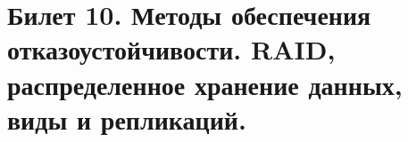 \newpage
\section {Билет 10. Методы обеспечения отказоустойчивости. RAID, распределенное хранение данных, виды и репликаций.}